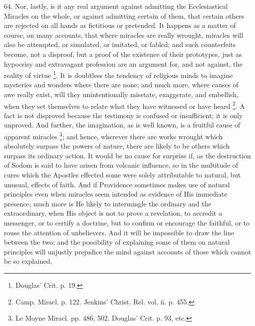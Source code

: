 64.
Nor, lastly, is it any real argument against admitting the
Ecclesiastical Miracles on the whole, or against admitting certain of
them, that certain others are rejected on all hands as fictitious or
pretended. It happens as a matter of course, on many accounts, that
where miracles are really wrought, miracles will also be attempted, or
simulated, or imitated, or fabled; and such counterfeits become, not a
disproof, but a proof of the existence of their prototypes, just as
hypocrisy and extravagant profession are an argument for, and not
against, the reality of virtue \footnote{Douglas' Crit. p. 19.}. It is doubtless the tendency
of religious minds to imagine mysteries and wonders where there are
none; and much more, where causes of awe really exist, will they
unintentionally misstate, exaggerate, and embellish, when they set
themselves to relate what they have witnessed or have heard \footnote{Camp. Miracl. p. 122. Jenkins' Christ. Rel.
vol. ii. p. 455.}.
A fact is not disproved because the testimony is confused or
insufficient; it is only unproved. And further, the imagination, as is
well known, is a fruitful cause of apparent miracles \footnote{Le Moyne Miracl. pp. 486, 502. Douglas' Crit.
p. 93, etc.};
and hence, wherever there are works wrought which absolutely surpass
the powers of nature, there are likely to be others which surpass its
ordinary action. It would be no cause for surprise if, as the
destruction of Sodom is said to have arisen from volcanic influence,
so in the multitude of cures which the Apostles effected some were
solely attributable to natural, but unusual, effects of faith. And if
Providence sometimes makes use of natural principles even when
miracles seem intended as evidence of His immediate presence, much
more is He likely to intermingle the ordinary and the extraordinary,
when His object is not to prove a revelation, to accredit a messenger,
or to certify a doctrine, but to confirm or encourage the faithful, or
to rouse the attention of unbelievers. And it will be impossible to
draw the line between the two; and the possibility of explaining some
of them on natural principles will unjustly prejudice the mind against
accounts of those which cannot be so explained.

